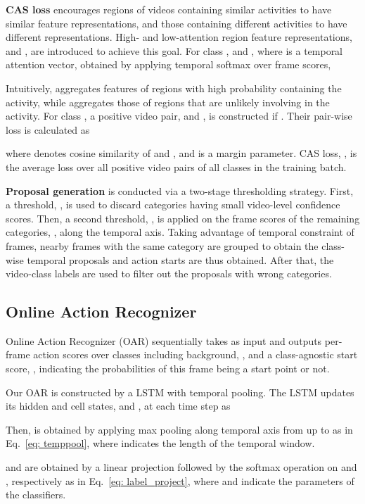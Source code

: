 \documentclass[final]{cvpr}
\begin{document}
\textbf{CAS loss} encourages regions of videos containing similar activities to have similar feature representations, and those containing different activities to have different representations. High- and low-attention region feature representations,  and , are introduced to achieve this goal. For class ,  and , where  is a temporal attention vector, obtained by applying temporal softmax over frame scores,  

Intuitively,  aggregates features of regions with high probability containing the activity, while   aggregates those of regions that are unlikely involving in the activity. For class , a positive video pair,  and , is constructed if . Their pair-wise loss is calculated as 

where  denotes cosine similarity of  and , and  is a margin parameter. CAS loss, , is the average loss over all positive video pairs of all classes in the training batch.

\textbf{Proposal generation} is conducted via a two-stage thresholding strategy. First, a threshold, , is used to discard categories having small video-level confidence scores. Then, a second threshold, , is applied on the frame scores of the remaining categories, , along the temporal axis. Taking advantage of temporal constraint of frames, nearby frames with the same category are grouped to obtain the class-wise temporal proposals and action starts are thus obtained. After that, the video-class labels are used to filter out the proposals with wrong categories.

\subsection{Online Action Recognizer}
\label{sec: oar}
Online Action Recognizer (OAR) sequentially takes  as input and outputs per-frame action scores over classes including background, , and a class-agnostic start score, , indicating the probabilities of this frame being a start point or not. 

Our OAR is constructed by a LSTM with temporal pooling. The LSTM updates its hidden and cell states,  and , at each time step as 


Then,  is obtained by applying max pooling along temporal axis from  up to  as in Eq.~\ref{eq: temppool}, where  indicates the length of the temporal window. 



 and  are obtained by a linear projection followed by the softmax operation on  and , respectively as in Eq.~\ref{eq: label_project}, where  and  indicate the parameters of the classifiers.
\end{document}
